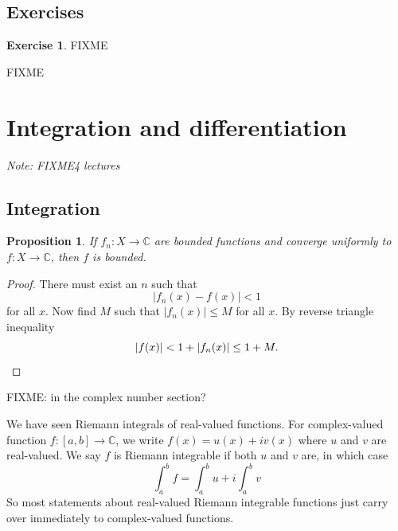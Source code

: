 \documentclass[12pt]{book}
\newcommand{\abs}[1]{\left\lvert {#1} \right\rvert}
\newcommand{\C}{{\mathbb{C}}}
\newcommand{\sectionnotes}[1]{\noindent \emph{Note: #1} \medskip \par}
\newcommand{\sectionnewpage}{\clearpage}
\theoremstyle{plain}
\newtheorem{prop}[thm]{Proposition}
\theoremstyle{remark}
\theoremstyle{definition}
\theoremstyle{exercise}
\newtheorem{exercise}{Exercise}[section]
\theoremstyle{example}
\begin{document}
\subsection{Exercises}

\begin{exercise}
FIXME
\end{exercise}

FIXME


\sectionnewpage
\section{Integration and differentiation}
\label{sec:FIXME}

\sectionnotes{FIXME4 lectures}

\subsection{Integration}

\begin{prop}
If $f_n \colon X \to \C$ are bounded functions and converge uniformly to $f
\colon X \to \C$, then $f$ is bounded.
\end{prop}

\begin{proof}
There must exist an $n$ such that
\begin{equation*}
\abs{f_n(x)-f(x)} < 1
\end{equation*}
for all $x$.
Now find $M$ such that $\abs{f_n(x)} \leq M$ for all $x$.
By reverse triangle inequality
\begin{equation*}
\abs{f(x)} < 1+ \abs{f_n(x)} \leq 1+M . \qedhere
\end{equation*}
\end{proof}

\medskip

FIXME: in the complex number section?

We have seen Riemann integrals of real-valued functions.  For complex-valued
function $f \colon [a,b] \to \C$, we write $f(x) = u(x) + iv(x)$
where $u$ and $v$ are real-valued.  We say $f$ is Riemann integrable
if both $u$ and $v$ are, in which case
$$
\int_a^b f = \int_a^b u + i \int_a^b v
$$
So most statements about real-valued Riemann integrable functions just
carry over immediately to complex-valued functions.

\end{document}
